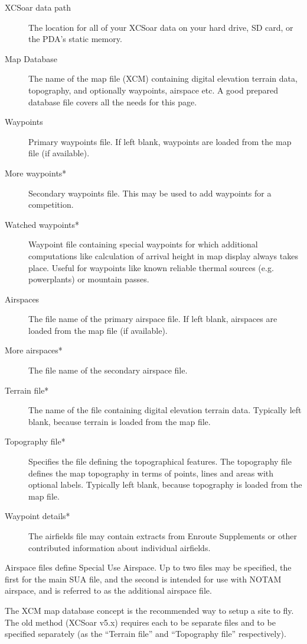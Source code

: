 \begin{description}
\item[XCSoar data path]  The location for all of your XCSoar data on your hard drive, 
  SD card, or the PDA's static memory.
\item[Map Database]  The name of the map file (XCM) containing digital elevation
  terrain data, topography, and optionally waypoints, airspace etc. A good
  prepared database file covers all the needs for this page.
\item[Waypoints]  Primary waypoints file.  If left blank, waypoints are loaded
from the map file (if available).
\item[More waypoints*]  Secondary waypoints file.  This may be used to add waypoints for a competition.
\item[Watched waypoints*]  Waypoint file containing special waypoints for which additional computations 
  like calculation of arrival height in map display always takes place. Useful for waypoints 
  like known reliable thermal sources (e.g. powerplants) or mountain passes.
\item[Airspaces]  The file name of the primary airspace file.  If left blank,
airspaces are loaded from the map file (if available).
\item[More airspaces*]  The file name of the secondary airspace file.
\item[Terrain file*]  The name of the file containing digital elevation
  terrain data.  Typically left blank, because terrain is loaded from the map
  file.
\item[Topography file*]  Specifies the file defining the topographical features.
The topography file defines the map topography in terms of points, lines
and areas with optional labels.  Typically left blank, because topography is
loaded from the map file.
\item[Waypoint details*]  The airfields file may contain extracts from Enroute Supplements or
other contributed information about individual airfields.
\end{description}

Airspace files define Special Use Airspace.  Up to two files may be
specified, the first for the main SUA file, and the second is intended
for use with NOTAM airspace, and is referred to as the additional
airspace file.

The XCM map database concept is the recommended way to setup a site to fly.
The old method (XCSoar v5.x) requires each to be separate files and to be
specified separately (as the ``Terrain file'' and ``Topography file'' respectively).  


